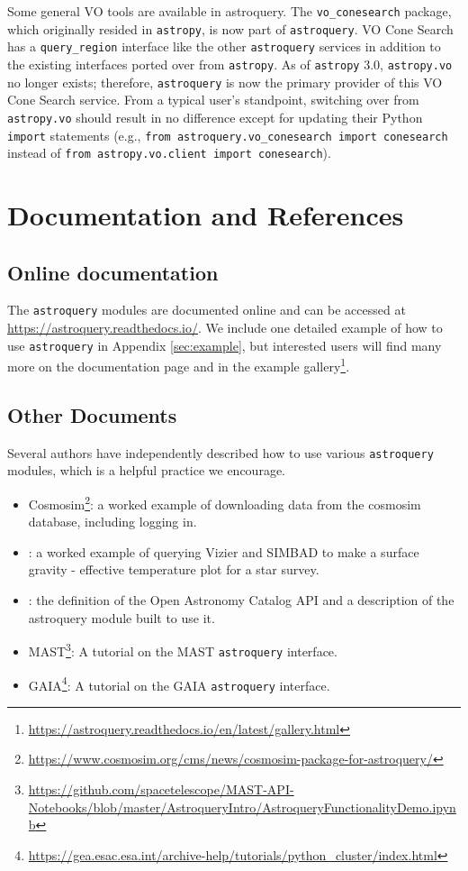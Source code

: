 \documentclass[twocolumn]{aastex62}
\newcommand{\package}[1]{\texttt{#1}\xspace}
\newcommand{\astroquery}{\package{astroquery}}
\newcommand{\astropypkg}{\package{astropy}}
\begin{document}
Some general VO tools are available in astroquery.  The \texttt{vo\_conesearch}
package, which originally resided in \astropypkg, is now part of \astroquery.  VO
Cone Search has a \texttt{query\_region} interface like the other \astroquery
services in addition to the existing interfaces ported over from \astropypkg.
As of \astropypkg 3.0, \texttt{astropy.vo} no longer exists; therefore,
\astroquery is now the primary provider of this VO Cone Search service. From a
typical user's standpoint, switching over from \texttt{astropy.vo} should
result in no difference except for updating their Python \texttt{import}
statements (e.g., \texttt{from astroquery.vo\_conesearch import conesearch}
instead of \texttt{from astropy.vo.client import conesearch}).



\section{Documentation and References}
\label{sec:documentation}
\subsection{Online documentation}
The \astroquery modules are documented online and can be accessed  at
\url{https://astroquery.readthedocs.io/}.  We include one detailed example of
how to use \astroquery in Appendix \ref{sec:example},
but interested users will find many more on the documentation page and
in the example gallery\footnote{\url{https://astroquery.readthedocs.io/en/latest/gallery.html}}.

\subsection{Other Documents}
Several authors have independently described how to use various \astroquery
modules, which is a helpful practice we encourage.
 \begin{itemize}
    \item
        Cosmosim\footnote{\url{https://www.cosmosim.org/cms/news/cosmosim-package-for-astroquery/}}:
        a worked example of downloading data from the cosmosim database,
        including logging in.
    \item \citet{Paletou2014a}: a worked example of querying
        Vizier and SIMBAD to make a surface gravity - effective temperature
        plot for a star survey.
    \item \citet{Guillochon2018a}: the definition of
        the Open Astronomy Catalog API and a description of the astroquery
        module built to use it.
    \item
        MAST\footnote{\url{https://github.com/spacetelescope/MAST-API-Notebooks/blob/master/AstroqueryIntro/AstroqueryFunctionalityDemo.ipynb}}:
        A tutorial on the MAST \astroquery interface.
    \item GAIA\footnote{\url{https://gea.esac.esa.int/archive-help/tutorials/python_cluster/index.html}}:
        A tutorial on the GAIA \astroquery interface.
\end{itemize}
\end{document}
